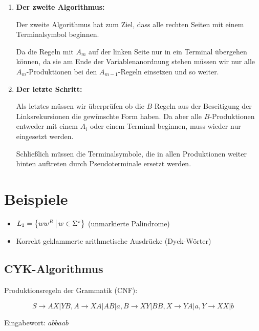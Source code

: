 \begin{enumerate}
	\item \textbf{Der zweite Algorithmus:}

	Der zweite Algorithmus hat zum Ziel, dass alle rechten Seiten mit einem Terminalsymbol beginnen.

	Da die Regeln mit $A_m$ auf der linken Seite nur in ein Terminal übergehen können, da sie am Ende der Variablenanordnung stehen müssen wir nur alle $A_m$-Produktionen bei den $A_{m-1}$-Regeln einsetzen und so weiter.

	\item \textbf{Der letzte Schritt:}

	Als letztes müssen wir überprüfen ob die $B$-Regeln aus der Beseitigung der Linksrekursionen die gewünschte Form haben.
	Da aber alle $B$-Produktionen entweder mit einem $A_i$ oder einem Terminal beginnen, muss wieder nur eingesetzt werden.

	Schließlich müssen die Terminalsymbole, die in allen Produktionen weiter hinten auftreten durch Pseudoterminale ersetzt werden.
\end{enumerate}

\section{Beispiele}
\begin{itemize}
	\item $L_1=\left\{ ww^R \,\middle|\, w\in\Sigma^\star \right\}$ (unmarkierte Palindrome)
	\item Korrekt geklammerte arithmetische Ausdrücke (Dyck-Wörter)
\end{itemize}
\subsection*{CYK-Algorithmus}
Produktionsregeln der Grammatik (CNF):

\begin{equation*}
	S\rightarrow AX|YB, A\rightarrow XA|AB|a, B\rightarrow XY|BB, X\rightarrow YA|a, Y\rightarrow XX|b
\end{equation*}

Eingabewort: $abbaab$

